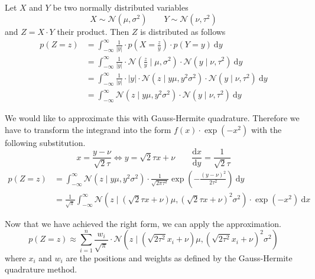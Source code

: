 \documentclass[11pt,a4paper]{book}
\begin{document}
Let $X$ and $Y$ be two normally distributed variables
\begin{equation*}
  X \sim \mathcal{N}(\mu, \sigma^{2}) \qquad Y \sim \mathcal{N}(\nu, \tau^{2})
\end{equation*}
and $Z = X \cdot Y$ their product. Then $Z$ is distributed as follows
\begin{align*}
  p(Z = z) & = \int_{-\infty}^{\infty} \frac{1}{|y|} \cdot p\left(X = \frac{z}{y}\right) \cdot p(Y = y)~\mathrm{d}y\\
           & = \int_{-\infty}^{\infty} \frac{1}{|y|} \cdot \mathcal{N}\left( \frac{z}{y} \mid \mu, \sigma^{2} \right) \cdot \mathcal{N}(y \mid \nu, \tau^{2})~\mathrm{d}y\\
           & = \int_{-\infty}^{\infty} \frac{1}{|y|} \cdot |y| \cdot \mathcal{N}\left( z \mid y\mu, y^{2}\sigma^{2} \right) \cdot \mathcal{N}(y \mid \nu, \tau^{2})~\mathrm{d}y\\
           & = \int_{-\infty}^{\infty} \mathcal{N}\left( z \mid y\mu, y^{2}\sigma^{2} \right) \cdot \mathcal{N}(y \mid \nu, \tau^{2})~\mathrm{d}y
\end{align*}

We would like to approximate this with Gauss-Hermite quadrature. Therefore we
have to transform the integrand into the form $f(x) \cdot \exp(-x^{2})$ with the
following substitution.
\begin{equation*}
  x = \frac{y - \nu}{\sqrt{2}\tau} \Leftrightarrow y = \sqrt{2}\tau x + \nu \qquad \frac{\mathrm{d}x}{\mathrm{d}y} = \frac{1}{\sqrt{2}\tau}
\end{equation*}
\begin{align*}
  p(Z = z) & = \int_{-\infty}^{\infty} \mathcal{N}\left( z \mid y\mu, y^{2}\sigma^{2} \right) \cdot \frac{1}{\sqrt{2\pi\tau^{2}}} \exp\left( -\frac{(y - \nu)^{2}}{2\tau^{2}} \right)~\mathrm{d}y\\
           & = \frac{1}{\sqrt{\pi}} \int_{-\infty}^{\infty} \mathcal{N}\left( z \mid \left(\sqrt{2}\tau x + \nu\right)\mu, \left(\sqrt{2}\tau x + \nu\right)^{2}\sigma^{2} \right) \cdot \exp\left( -x^{2} \right)~\mathrm{d}x
\end{align*}

Now that we have achieved the right form, we can apply the approximation.
\begin{equation*}
  p(Z = z) \approx \sum_{i = 1}^{n} \frac{w_{i}}{\sqrt{\pi}} \cdot \mathcal{N}\left( z \mid \left(\sqrt{2 \tau^{2}} x_{i} + \nu\right)\mu, \left(\sqrt{2 \tau^{2}} x_{i} + \nu\right)^{2}\sigma^{2} \right)
\end{equation*}
where $x_{i}$ and $w_{i}$ are the positions and weights as defined by the
Gauss-Hermite quadrature method.
\end{document}
